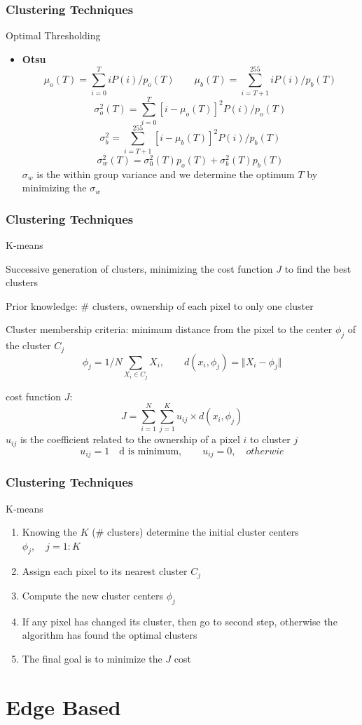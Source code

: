 \documentclass{beamer}
\begin{document}
\begin{frame}
\frametitle{Clustering Techniques}
\begin{block}{Optimal Thresholding}
\begin{itemize}
\item\textbf{Otsu}
\scriptsize{
$$\mu_{o}(T) = \sum\limits_{i=0}^{T}iP(i)/p_{o}(T) \qquad \mu_{b}(T) = \sum\limits_{i=T+1}^{255}iP(i)/p_{b}(T) $$
$$\sigma_{o}^{2}(T) = \sum\limits_{i=0}^{T}[i-\mu_{o}(T)]^{2}P(i)/p_{o}(T) $$
$$\sigma_{b}^{2} =\sum\limits_{i=T+1}^{255} [i-\mu_{b}(T)]^{2}P(i)/p_{b}(T)  $$ 
$$ \sigma_{w}^{2}(T) =  \sigma_{0}^{2}(T)p_{o}(T)+\sigma_{b}^{2}(T)p_{b}(T)$$
\noindent $\sigma_{w}$ is the within group variance and we determine the optimum $T$ by minimizing the $\sigma_{w}$}
\end{itemize}

\end{block}
\end{frame}
\begin{frame}
\frametitle{Clustering Techniques}
\begin{block}{K-means}
\begin{itemize}
\scriptsize{
\item Successive generation of clusters, minimizing the cost function $J$ to find the best clusters
\item Prior knowledge: \# clusters, ownership of each pixel to only one cluster
\item Cluster membership criteria: minimum distance from the pixel to the center $\phi_{j}$ of the cluster $C_{j}$ 
$$\phi_{j} = 1/N \sum\limits_{X_{i}\in C_{j}}X_{i}, \qquad d(x_{i}, \phi_{j}) = \Vert X_{i} - \phi_{j}\Vert $$
\item cost function $J$:
$$J = \sum\limits_{i=1}^{N} \sum\limits_{j=1}^{K} u_{ij}\times d(x_{i}, \phi_{j})$$
\noindent $u_{ij}$ is the coefficient related to the ownership of a pixel $i$ to cluster $j$\\
$$u_{ij} = 1 \quad \text{d is minimum}, \qquad u_{ij} = 0, \quad otherwie$$
}
\end{itemize}

\end{block}
\end{frame}
\begin{frame}
\frametitle{Clustering Techniques}
\begin{block}{K-means}
\begin{enumerate}
\item Knowing the $K$ (\# clusters) determine the initial cluster centers $\phi_{j}, \quad j = 1: K$
\item Assign each pixel to its nearest cluster $C_{j}$
\item Compute the new cluster centers $\phi_{j}$
\item If any pixel has changed its cluster, then go to second step, otherwise the algorithm has found the optimal clusters
\item The final goal is to minimize the $J$ cost

\end{enumerate}

\end{block}

\end{frame}
\section{Edge Based}

\end{document}

